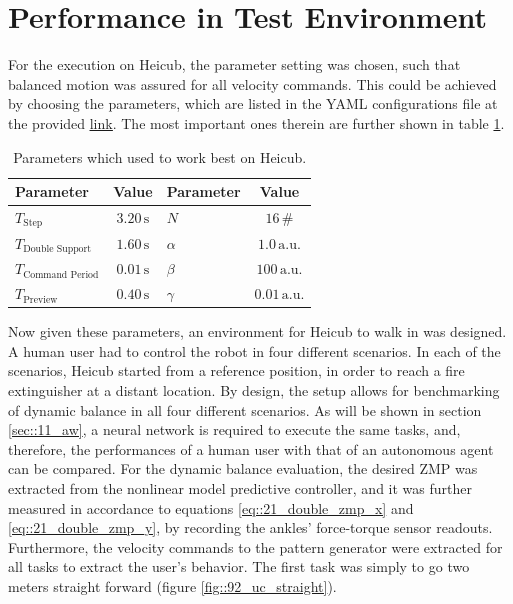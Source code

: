 \section{Performance in Test Environment}
\label{sec::92_pt}
For the execution on Heicub, the parameter setting was chosen, such that balanced motion was assured for all velocity commands. This could be achieved by choosing the parameters, which are listed in the YAML configurations file at the provided \href{https://github.com/mhubii/nmpc_pattern_generator/blob/719fde0bb73925923de85cbf379c5523e075dfeb/libs/pattern_generator/configs.yaml#L1}{\underline{link}}. The most important ones therein are further shown in table \ref{tab::92_params}.
\begin{table}
	\centering
	\caption{Parameters which used to work best on Heicub.}
	\begin{tabular}{lclc}
		Parameter&Value&Parameter&Value\\
		\hline
		$T_{\text{Step}}$ & $3.20\,\text{s}$ & $N$ & $16\,\text{\#}$ \\
		$T_{\text{Double Support}}$ & $1.60\,\text{s}$ & $\alpha$ & $1.0\,\text{a.u.}$ \\
		$T_{\text{Command Period}}$  & $0.01\,\text{s}$& $\beta$ & $100\,\text{a.u.}$ \\
		$T_{\text{Preview}}$ & $0.40\,\text{s}$ & $\gamma$ & $0.01\,\text{a.u.}$
	\end{tabular}
	\label{tab::92_params}
\end{table}
Now given these parameters, an environment for Heicub to walk in was designed. A human user had to control the robot in four different scenarios. In each of the scenarios, Heicub started from a reference position, in order to reach a fire extinguisher at a distant location. By design, the setup allows for benchmarking of dynamic balance in all four different scenarios. As will be shown in section \ref{sec::11_aw}, a neural network is required to execute the same tasks, and, therefore, the performances of a human user with that of an autonomous agent can be compared. For the dynamic balance evaluation, the desired ZMP was extracted from the nonlinear model predictive controller, and it was further measured in accordance to equations \ref{eq::21_double_zmp_x} and \ref{eq::21_double_zmp_y}, by recording the ankles' force-torque sensor readouts. Furthermore, the velocity commands to the pattern generator were extracted for all tasks to extract the user's behavior. The first task was simply to go two meters straight forward (figure \ref{fig::92_uc_straight}).
